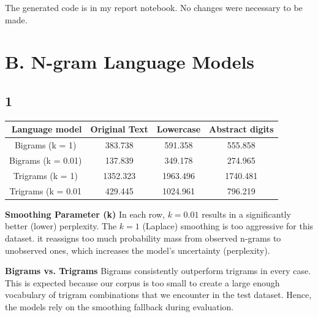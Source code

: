 \documentclass[8pt,a4paper]{report}%
\begin{document}
The generated code is in my report notebook. No changes were necessary to be made.

\section*{B. N-gram Language Models}

\subsection*{1}

\begin{table}[H]
\centering
\begin{tabular}{|c|c|c|c|}
\hline
\multicolumn{1}{|r|}{\textbf{Language model}} & \multicolumn{1}{l|}{\textbf{Original Text}} & \multicolumn{1}{r|}{\textbf{Lowercase}} & \multicolumn{1}{r|}{\textbf{Abstract digits}} \\ \hline
Bigrams (k = 1)                               & 383.738                                     & 591.358                                 & 555.858                                       \\ \hline
Bigrams (k = 0.01)                            & 137.839                                     & 349.178                                 & 274.965                                       \\ \hline
Trigrams (k = 1)                              & 1352.323                                    & 1963.496                                & 1740.481                                      \\ \hline
Trigrams (k = 0.01                            & 429.445                                     & 1024.961                                & 796.219                                       \\ \hline
\end{tabular}
\end{table}

\textbf{Smoothing Parameter (k)}
In each row, $k=0.01$ results in a significantly better (lower) perplexity. The $k=1$ (Laplace) smoothing is too aggressive for this dataset. it reassigns too much probability mass from observed n-grams to unobserved ones, which increases the model's uncertainty (perplexity).

\textbf{Bigrams vs. Trigrams}
Bigrams consistently outperform trigrams in every case. This is expected because our corpus is too small to create a large enough vocabulary of trigram combinations that we encounter in the test dataset. Hence, the models rely on the smoothing fallback during evaluation.
\end{document}
